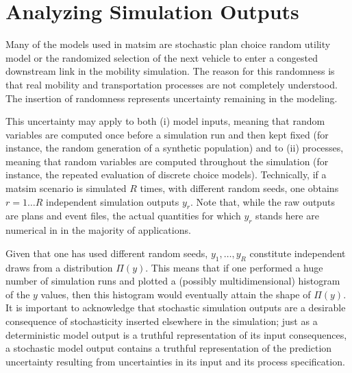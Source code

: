 \section{\label{sec:Statistical-analysis-of}Analyzing Simulation Outputs}

%

Many of the models used in \gls{matsim} are stochastic plan choice random utility model or the randomized selection
of the next vehicle to enter a congested downstream link in the mobility
simulation. The reason for this randomness is that real mobility and
transportation processes are not completely understood.
The insertion of randomness represents uncertainty remaining in
the modeling. 

This uncertainty may apply to both (i) model inputs, meaning that
random variables are computed once before a simulation run and then
kept fixed (for instance, the random generation of a synthetic population)
and to (ii) processes, meaning that random variables are computed
throughout the simulation (for instance, the repeated evaluation of
discrete choice models). Technically, if a \gls{matsim} scenario is simulated
$R$ times, with different random seeds, one obtains $r=1\ldots R$
independent simulation outputs $y_{r}$. Note that, while the raw outputs
are plans and event files, the actual quantities for which $y_{r}$
stands here are numerical in in the majority of applications.

Given that one has used different random seeds, $y_{1},\ldots,y_{R}$
constitute independent draws from a distribution $\Pi(y)$. This means
that if one performed a huge number of simulation runs and plotted
a (possibly multidimensional) histogram of the $y$ values, then this
histogram would eventually attain the shape of $\Pi(y)$. It is important
to acknowledge that stochastic simulation outputs are a desirable
consequence of stochasticity inserted elsewhere in the simulation;
just as a deterministic model output is a truthful representation
of its input consequences, a stochastic model output contains
a truthful representation of the prediction uncertainty resulting
from uncertainties in its input and its process specification.

